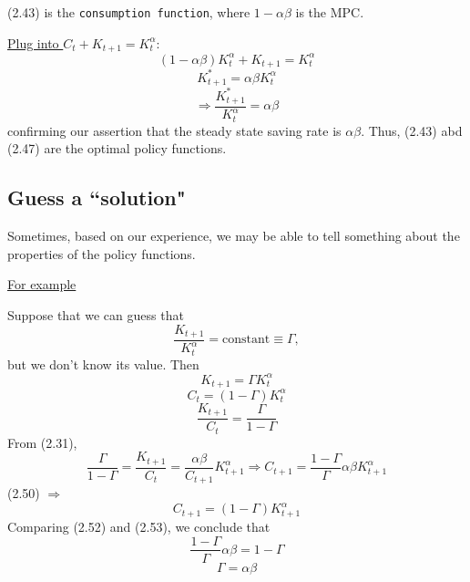 \documentclass[twoside]{article}
\begin{document}
(2.43) is the \texttt{consumption function}, where $1- \alpha \beta $ is the MPC.

\underline{Plug into } $C_t + K_{t+1} = K_t^\alpha$:
\begin{equation}
    (1- \alpha \beta )K_t^\alpha + K_{t+1} = K_t^\alpha
\end{equation}
\begin{equation}
    K_{t+1}^* = \alpha \beta K_t^\alpha
\end{equation}
\[
\Longrightarrow \frac{K_{t+1}^*}{K_t^\alpha} = \alpha \beta
\]
confirming our assertion that the steady state saving rate is $\alpha \beta $. Thus, (2.43) abd (2.47) are the optimal policy functions.

\subsection{Guess a ``solution"}
Sometimes, based on our experience, we may be able to tell something about the properties of the policy functions.

\underline{For example}

Suppose that we can guess that \begin{equation}
    \frac{K_{t+1}}{K_t^\alpha} = \text{constant} \equiv \Gamma,
\end{equation}
but we don't know its value. Then 
\begin{equation}
    K_{t+1} = \Gamma K_t^\alpha
\end{equation}
\begin{equation}
    C_t = (1-\Gamma) K_t^\alpha
\end{equation}
\begin{equation}
    \frac{K_{t+1}}{C_t} = \frac{\Gamma}{1- \Gamma}
\end{equation}
From (2.31),
\begin{equation}
    \frac{\Gamma}{1- \Gamma} = \frac{K_{t+1}}{C_t} = \frac{\alpha \beta}{C_{t+1}}K_{t+1}^\alpha \Longrightarrow C_{t+1} = \frac{1- \Gamma}{\Gamma}\alpha \beta K_{t+1}^\alpha
\end{equation}
(2.50) $\Longrightarrow$ 
\begin{equation}
    C_{t+1} = (1-\Gamma) K_{t+1}^\alpha
\end{equation}
Comparing (2.52) and (2.53), we conclude that 
\begin{equation}
    \frac{1- \Gamma}{\Gamma}\alpha \beta = 1-\Gamma
\end{equation}
\begin{equation}
    \Gamma = \alpha \beta
\end{equation}
\end{document}
